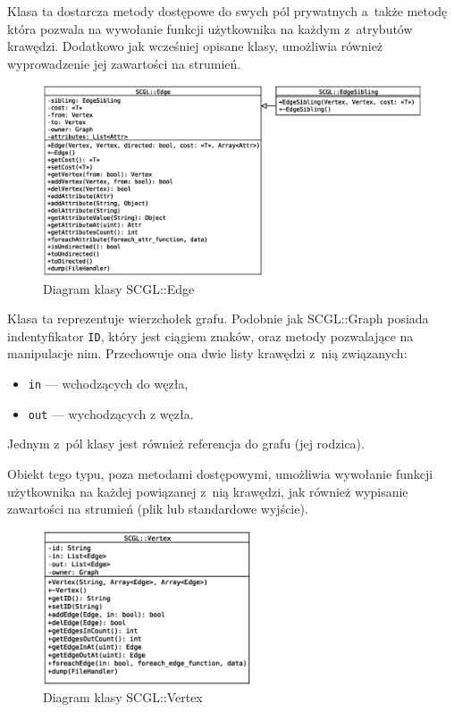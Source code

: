 \documentclass[a4paper,12pt,polish,oneside,openright]{thesis}
\newcommand\code[1]{\lstinline[style=line]{#1}}
\begin{document}
\begin{description}
	Klasa ta dostarcza metody dostępowe do swych pól prywatnych a~także metodę która pozwala na wywołanie funkcji użytkownika na każdym z~atrybutów krawędzi.
	Dodatkowo jak wcześniej opisane klasy, umożliwia również wyprowadzenie jej zawartości na strumień.
	\begin{figure}[htb]
	\begin{center}
		\includegraphics[width=1.00\textwidth]{class_edge.eps}
		\caption{Diagram klasy SCGL::Edge}
	\end{center}
	\end{figure}

	\item[SCGL::Vertex]
	Klasa ta reprezentuje wierzchołek grafu.
	Podobnie jak SCGL::Graph posiada indentyfikator \code{ID}, który jest ciągiem znaków, oraz metody pozwalające na manipulacje nim.
	Przechowuje ona dwie listy krawędzi z~nią związanych:
	\begin{itemize}
		\item \code{in} --- wchodzących do węzła,
		\item \code{out} --- wychodzących z węzła.
	\end{itemize}
	Jednym z~pól klasy jest również referencja do grafu (jej rodzica).

	Obiekt tego typu, poza metodami dostępowymi, umożliwia wywołanie funkcji użytkownika na każdej powiązanej z~nią krawędzi, jak również wypisanie zawartości na strumień (plik lub standardowe wyjście).
	\begin{figure}[htb]
	\begin{center}
		\includegraphics[width=0.55\textwidth]{class_vertex.eps}
		\caption{Diagram klasy SCGL::Vertex}
	\end{center}
	\end{figure}


\end{description}
\end{document}
